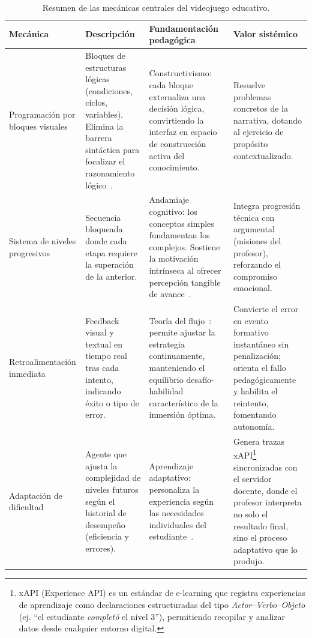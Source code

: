 \begin{table}[H]
	\centering
	\footnotesize
	\setlength{\tabcolsep}{3pt}
	\renewcommand{\arraystretch}{0.92}
	\caption{Resumen de las mecánicas centrales del videojuego educativo.}
	\label{tab:mecanicas}
	\begin{tabular}{@{}>{\raggedright\arraybackslash}p{2.8cm}>{\raggedright\arraybackslash}p{3.6cm}>{\raggedright\arraybackslash}p{4.2cm}>{\raggedright\arraybackslash}p{3.6cm}@{}}
		\toprule
		\textbf{Mecánica} & \textbf{Descripción} & \textbf{Fundamentación pedagógica} & \textbf{Valor sistémico} \\
		\midrule
		Programación por bloques visuales & 
		Bloques de estructuras lógicas (condiciones, ciclos, variables). Elimina la barrera sintáctica para focalizar el razonamiento lógico~\cite{ibrahim_students_2010,mathew_teaching_2019}. & 
		Constructivismo: cada bloque externaliza una decisión lógica, convirtiendo la interfaz en espacio de construcción activa del conocimiento. & 
		Resuelve problemas concretos de la narrativa, dotando al ejercicio de propósito contextualizado. \\
		\midrule
		Sistema de niveles progresivos & 
		Secuencia bloqueada donde cada etapa requiere la superación de la anterior. & 
		Andamiaje cognitivo: los conceptos simples fundamentan los complejos. Sostiene la motivación intrínseca al ofrecer percepción tangible de avance~\cite{kiili_design_2012,puritat_enhanced_2019}. & 
		Integra progresión técnica con argumental (misiones del profesor), reforzando el compromiso emocional. \\
		\midrule
		Retroalimentación inmediata & 
		Feedback visual y textual en tiempo real tras cada intento, indicando éxito o tipo de error. & 
		Teoría del flujo~\cite{Csikszentmihalyi_2008}: permite ajustar la estrategia continuamente, manteniendo el equilibrio desafío-habilidad característico de la inmersión óptima. & 
		Convierte el error en evento formativo instantáneo sin penalización; orienta el fallo pedagógicamente y habilita el reintento, fomentando autonomía. \\
		\midrule
		Adaptación de dificultad & 
		Agente que ajusta la complejidad de niveles futuros según el historial de desempeño (eficiencia y errores). & 
		Aprendizaje adaptativo: personaliza la experiencia según las necesidades individuales del estudiante~\cite{shum_personalised_2023}. & 
		Genera trazas xAPI\footnote{xAPI (Experience API) es un estándar de e-learning que registra experiencias de aprendizaje como declaraciones estructuradas del tipo \textit{Actor--Verbo--Objeto} (ej. ``el estudiante \textit{completó} el nivel 3''), permitiendo recopilar y analizar datos desde cualquier entorno digital.} sincronizadas con el servidor docente, donde el profesor interpreta no solo el resultado final, sino el proceso adaptativo que lo produjo. \\
		\bottomrule
	\end{tabular}
\end{table}

